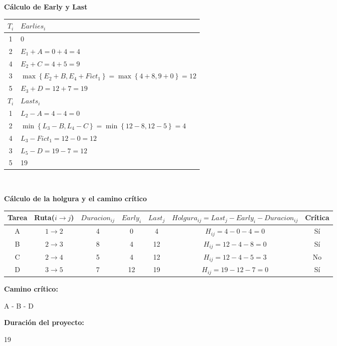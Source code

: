 \documentclass{llncs}
\begin{document}
\vspace{0.5cm}

\textbf{Cálculo de Early y Last}
\begin{table}
\label{tab:tabla2}
\centering
\begin{tabular}{C|l}
\toprule
$T_i$ & $Earlies_i$ \\
 & 0 \\
 & $E_1 + A = 0 + 4 = 4$ \\
 & $E_2 + C = 4 + 5 = 9$ \\
 & $\max \left\{ E_2 + B, E_4 + Fict_1 \right\} = \max \left\{ 4 + 8, 9 + 0 \right\} = 12$ \\
 & $E_3 + D = 12 + 7 = 19$ \\
\bottomrule
\toprule
$T_i$ & $Lasts_i$ \\
 & $L_2 - A = 4 - 4 = 0$ \\
 & $\min \left\{ L_3 - B, L_4 - C \right\} = \min \left\{ 12 - 8, 12 - 5 \right\} = 4$ \\
 & $L_3 - Fict_1 = 12 - 0 = 12$ \\
 & $L_5 - D = 19 - 7 = 12$ \\
 & 19 \\
\bottomrule
\end{tabular}
\end{table} \\

\newpage

\textbf{Cálculo de la holgura y el camino crítico}
\begin{table}
\label{tab:tabla3}
\centering
\begin{tabular}{C|CCCCcC}
\toprule
Tarea & Ruta($i \rightarrow j$) & $Duracion_{ij}$ & $Early_i$ & $Last_j$ & $Holgura_{ij} = Last_j - Early_i - Duracion_{ij}$ & Crítica \\
\midrule
A & $1 \rightarrow 2$ & 4 & 0 & 4 & $H_{ij} = 4 - 0 - 4 = 0$ & Sí \\
B & $2 \rightarrow 3$ & 8 & 4 & 12 & $H_{ij} = 12 - 4 - 8 = 0$ & Sí \\
C & $2 \rightarrow 4$ & 5 & 4 & 12 & $H_{ij} = 12 - 4 - 5 = 3$ & No \\
D & $3 \rightarrow 5$ & 7 & 12 & 19 & $H_{ij} = 19 - 12 - 7 = 0$ & Sí \\
\bottomrule
\end{tabular}
\end{table}

\begin{multicols}{2}
\textbf{Camino crítico:}

A - B - D

\textbf{Duración del proyecto:}

19
\end{multicols}
\end{document}
